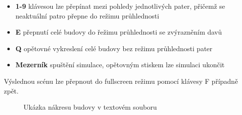 \documentclass[czech,public,dept460,male,cpdeclaration]{diploma}
\begin{document}
\begin{itemize}
	\item \textbf{1-9} klávesou lze přepínat mezi pohledy jednotlivých pater, přičemž se neaktuální patro přepne do režimu průhlednosti
	\item \textbf{E} přepnutí celé budovy do řežimu průhlednosti se zvýrazněním davů
	\item \textbf{Q} opětovné vykreslení celé budovy bez režimu průhlednosti pater
	\item \textbf{Mezerník} spuštění simulace, opětovným stiskem lze simulaci ukončit
\end{itemize}

Výslednou scénu lze přepnout do fullscreen režimu pomocí klávesy F případně zpět.

\begin{figure}[H]
	\centering
	\hfill
	\caption{Ukázka nákresu budovy v textovém souboru} \label{fig:mapatxt}
\end{figure}

	
\end{document}
